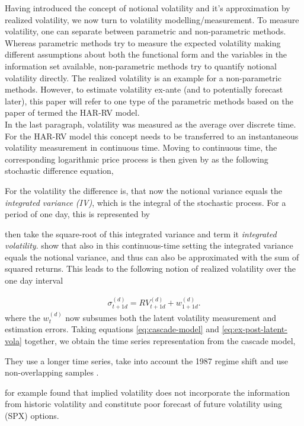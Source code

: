 Having introduced the concept of notional volatility and it's approximation by realized volatility, we now turn to volatility modelling/measurement. To measure volatility, one can separate between parametric and non-parametric methods. Whereas parametric methods try to measure the expected volatility making different assumptions about both the functional form and the variables in the information set available, non-parametric methods try to quantify notional volatility directly. The realized volatility is an example for a non-parametric methods. However, to estimate volatility ex-ante (and to potentially forecast later), this paper will refer to one type of the parametric methods based on the paper of \textcite{corsi2009} termed the HAR-RV model.\\

In the last paragraph, volatility was measured as the average over discrete time. For the HAR-RV model this concept needs to be transferred to an instantaneous volatility measurement in continuous time. Moving to continuous time, the corresponding logarithmic price process is then given by \textcite{corsi2009} as the following stochastic difference equation,

 For the volatility the difference is, that now the notional variance equals the \emph{integrated variance (IV)}, which is the integral of the stochastic process. For a period of one day, this is represented by

\textcite{corsi2009} then take the square-root of this integrated variance and term it \emph{integrated volatility}. \textcite{andersen2001} show that also in this continuous-time setting the integrated variance equals the notional variance, and thus can also be approximated with the sum of squared returns. This leads to the following notion of realized volatility over the one day interval

\begin{align}\label{eq:ex-post-latent-vola}
\sigma_{t+1d}^{(d)} = RV_{t+1d}^{(d)} + w_{1+1d}^{(d)}.
\end{align}
where the $w_{t}^{(d)}$ now subsumes both the latent volatility measurement and estimation errors.  Taking equations \ref{eq:cascade-model} and \ref{eq:ex-post-latent-vola} together, we obtain the time series representation from the cascade model,

They use a longer time series, take into account the 1987 regime shift and use non-overlapping samples \parencite{jiang2003}.

\textcite{canina1993} for example found that implied volatility does not incorporate the information from historic volatility and constitute poor forecast of future volatility using (\gls{SPX}) options.


